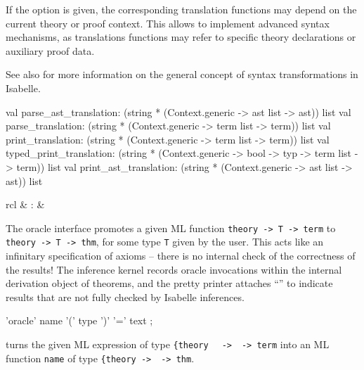 \begin{isabellebody}
\begin{isamarkuptext}
  If the  option is given, the corresponding
  translation functions may depend on the current theory or proof
  context.  This allows to implement advanced syntax mechanisms, as
  translations functions may refer to specific theory declarations or
  auxiliary proof data.

  See also \cite[\S8]{isabelle-ref} for more information on the
  general concept of syntax transformations in Isabelle.

\begin{ttbox}
val parse_ast_translation:
  (string * (Context.generic -> ast list -> ast)) list
val parse_translation:
  (string * (Context.generic -> term list -> term)) list
val print_translation:
  (string * (Context.generic -> term list -> term)) list
val typed_print_translation:
  (string * (Context.generic -> bool -> typ -> term list -> term)) list
val print_ast_translation:
  (string * (Context.generic -> ast list -> ast)) list
\end{ttbox}%
\end{isamarkuptext}%
\isamarkuptrue%
%
\isamarkuptrue%
%
\begin{isamarkuptext}%
\begin{matharray}{rcl}
     & : &  \\
  \end{matharray}

  The oracle interface promotes a given ML function \verb|theory -> T -> term| to \verb|theory -> T -> thm|, for some type
  \verb|T| given by the user.  This acts like an infinitary
  specification of axioms -- there is no internal check of the
  correctness of the results!  The inference kernel records oracle
  invocations within the internal derivation object of theorems, and
  the pretty printer attaches ``\isa{{\isacharbrackleft}{\isacharbang}{\isacharbrackright}}'' to indicate results
  that are not fully checked by Isabelle inferences.

  \begin{rail}
    'oracle' name '(' type ')' '=' text
    ;
  \end{rail}

  \begin{descr}

  \item [\isa{\isacommand{oracle}}~\isa{name\ {\isacharparenleft}type{\isacharparenright}\ {\isacharequal}\ text}] turns the
  given ML expression  of type \verb|{theory|\isasep\isanewline%
\verb|  ->|~~\verb|-> term| into an ML function
  \verb|name| of type \verb|{theory ->|~~\verb|-> thm|.


\end{descr}
\end{isamarkuptext}
\end{isabellebody}
